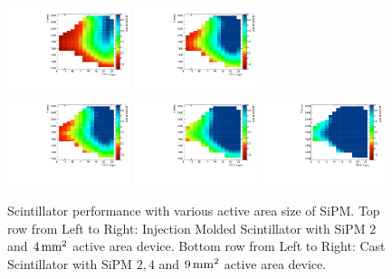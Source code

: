 \begin{figure}
  \centering
  \includegraphics[width=0.32\textwidth]{figures/hgcal/plot_zr/mold_mip_25_pdeC_34.9_40_sipmA_2.0_rad_4_sipmN_52_sipmAC_default_tileAC_default_S_N.pdf}
  \includegraphics[width=0.32\textwidth]{figures/hgcal/plot_zr/mold_mip_25_pdeC_34.9_40_sipmA_4.0_rad_4_sipmN_52_sipmAC_default_tileAC_default_S_N.pdf}\\
  \includegraphics[width=0.32\textwidth]{figures/hgcal/plot_zr/cast_mip_35_pdeC_34.9_40_sipmA_2.0_rad_4_sipmN_52_sipmAC_default_tileAC_default_S_N.pdf}
  \includegraphics[width=0.32\textwidth]{figures/hgcal/plot_zr/cast_mip_35_pdeC_34.9_40_sipmA_4.0_rad_4_sipmN_52_sipmAC_default_tileAC_default_S_N.pdf}
  \includegraphics[width=0.32\textwidth]{figures/hgcal/plot_zr/cast_mip_35_pdeC_34.9_40_sipmA_9.0_rad_4_sipmN_52_sipmAC_default_tileAC_default_S_N.pdf}
  \caption[Scintillator performance with various active area size
    of \gls{SiPM}]{Scintillator performance with various active area size
    of \gls{SiPM}. Top row from Left to Right: Injection Molded
    Scintillator with \gls{SiPM} \( 2 \) and \( 4\,\text{mm}{}^2 \) active area device.
    Bottom row from Left to Right: Cast Scintillator with
    \gls{SiPM} \( 2,4 \) and \( 9\,\text{mm}{}^2 \) active area device.}%
  \label{fig:hgcal-scint-everywhere}
\end{figure}

